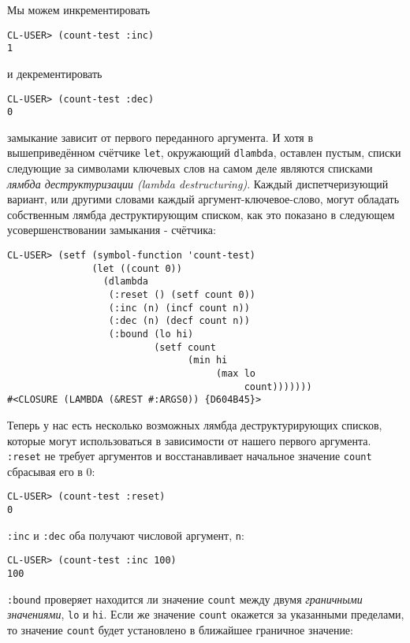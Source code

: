 Мы можем инкрементировать

\begin{verbatim}
CL-USER> (count-test :inc)
1
\end{verbatim}

и декрементировать

\begin{verbatim}
CL-USER> (count-test :dec)
0
\end{verbatim}

замыкание зависит от первого переданного аргумента. И хотя в вышеприведённом счётчике \verb"let", окружающий \verb"dlambda", оставлен пустым, списки следующие за символами ключевых слов на самом деле являются списками \emph{лямбда деструктуризации (lambda destructuring)}. Каждый диспетчеризующий вариант, или другими словами каждый аргумент-ключевое-слово, могут обладать собственным лямбда деструктирующим списком, как это показано в следующем усовершенствовании замыкания - счётчика:

\begin{verbatim}
CL-USER> (setf (symbol-function 'count-test)
               (let ((count 0))
                 (dlambda
                  (:reset () (setf count 0))
                  (:inc (n) (incf count n))
                  (:dec (n) (decf count n))
                  (:bound (lo hi)
                          (setf count
                                (min hi
                                     (max lo
                                          count)))))))
#<CLOSURE (LAMBDA (&REST #:ARGS0)) {D604B45}>
\end{verbatim}

Теперь у нас есть несколько возможных лямбда деструктурирующих списков, которые могут использоваться в зависимости от нашего первого аргумента. \verb":reset" не требует аргументов и восстанавливает начальное значение \verb"count" сбрасывая его в 0:

\begin{verbatim}
CL-USER> (count-test :reset)
0
\end{verbatim}

\verb":inc" и \verb":dec" оба получают числовой аргумент, \verb"n":

\begin{verbatim}
CL-USER> (count-test :inc 100)
100
\end{verbatim}

\verb":bound" проверяет находится ли значение \verb"count" между двумя \emph{граничными значениями}, \verb"lo" и \verb"hi". Если же значение \verb"count" окажется за указанными пределами, то значение \verb"count" будет установлено в ближайшее граничное значение:

